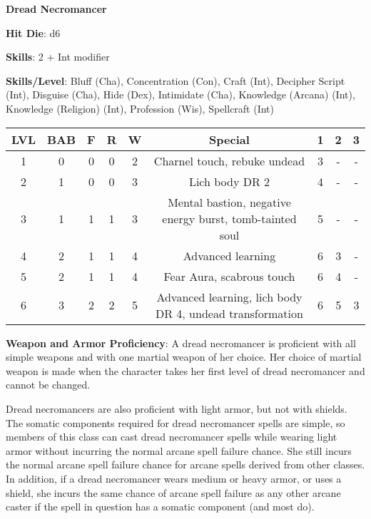 \textbf{\huge{Dread Necromancer}}

\textbf{Hit Die}: d6

\textbf{Skills}: 2 + Int modifier

\textbf{Skills/Level}: Bluff (Cha), Concentration (Con), Craft (Int), Decipher Script (Int), Disguise (Cha), Hide (Dex), Intimidate (Cha), Knowledge (Arcana) (Int), Knowledge (Religion) (Int), Profession (Wis), Spellcraft (Int)

\begin{center}
\begin{adjustwidth}{-4cm}{}
\begin{small}
\begin{tabular}{| c | c | c | c | c | c | c | c | c |}
\hline
LVL &BAB &F &R &W &Special &1 &2 &3 \\
\hline
1 &0 &0 &0 &2 &Charnel touch, rebuke undead &3 &- &- \\
2 &1 &0 &0 &3 &Lich body DR 2 &4 &- &- \\
3 &1 &1 &1 &3 &Mental bastion, negative energy burst, tomb-tainted soul &5 &- &- \\
4 &2 &1 &1 &4 &Advanced learning &6 &3 &- \\
5 &2 &1 &1 &4 &Fear Aura, scabrous touch &6 &4 &- \\
6 &3 &2 &2 &5 &Advanced learning, lich body DR 4, undead transformation &6 &5 &3 \\
\hline
\end{tabular}
\end{small}
\end{adjustwidth}
\end{center}

\textbf{Weapon and Armor Proficiency}: A dread necromancer is proficient with all simple weapons and with one martial weapon of her choice. Her choice of martial weapon is made when the character takes her first level of dread necromancer and cannot be changed.

Dread necromancers are also proficient with light armor, but not with shields. The somatic components required for dread necromancer spells are simple, so members of this class can cast dread necromancer spells while wearing light armor without incurring the normal arcane spell failure chance. She still incurs the normal arcane spell failure chance for arcane spells derived from other classes. In addition, if a dread necromancer wears medium or heavy armor, or uses a shield, she incurs the same chance of arcane spell failure as any other arcane caster if the spell in question has a somatic component (and most do).

